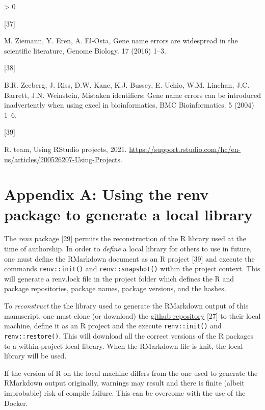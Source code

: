\documentclass[]{elsarticle} %
\newlength{\csllabelwidth}
\newlength{\cslhangindent}
\newenvironment{CSLReferences}[3] %
 {%
  \setlength{\parindent}{0pt}
  \ifodd #1 \everypar{\setlength{\hangindent}{\cslhangindent}}\ignorespaces\fi
  \ifnum #2 > 0
  \setlength{\parskip}{#2\baselineskip}
  \fi
 }%
 {}
\newcommand{\CSLLeftMargin}[1]{\parbox[t]{\csllabelwidth}{#1}}
\newcommand{\CSLRightInline}[1]{\parbox[t]{\linewidth - \csllabelwidth}{#1}}
\begin{document}
\begin{CSLReferences}{0}{0}
\leavevmode\hypertarget{ref-ziemann2016gene}{}%
\CSLLeftMargin{{[}37{]} }
\CSLRightInline{M. Ziemann, Y. Eren, A. El-Osta, Gene name errors are
widespread in the scientific literature, Genome Biology. 17 (2016)
1--3.}

\leavevmode\hypertarget{ref-zeeberg2004mistaken}{}%
\CSLLeftMargin{{[}38{]} }
\CSLRightInline{B.R. Zeeberg, J. Riss, D.W. Kane, K.J. Bussey, E. Uchio,
W.M. Linehan, J.C. Barrett, J.N. Weinstein, Mistaken identifiers: Gene
name errors can be introduced inadvertently when using excel in
bioinformatics, BMC Bioinformatics. 5 (2004) 1--6.}

\leavevmode\hypertarget{ref-rprojects}{}%
\CSLLeftMargin{{[}39{]} }
\CSLRightInline{R. team, Using RStudio projects, 2021.
\url{https://support.rstudio.com/hc/en-us/articles/200526207-Using-Projects}.}

\end{CSLReferences}

\hypertarget{appendix-a-using-the-renv-package-to-generate-a-local-library}{%
\section*{Appendix A: Using the renv package to generate a local
library}\label{appendix-a-using-the-renv-package-to-generate-a-local-library}}

The \emph{renv} package {[}29{]} permits the reconstruction of the R
library used at the time of authorship. In order to \emph{define} a
local library for others to use in future, one must define the RMarkdown
document as an R project {[}39{]} and execute the commands
\texttt{renv::init()} and \texttt{renv::snapshot()} within the project
context. This will generate a renv.lock file in the project folder which
defines the R and package repositories, package names, package versions,
and the hashes.

To \emph{reconstruct} the the library used to generate the RMarkdown
output of this manuscript, one must clone (or download) the
\href{https://github.com/drdanholmes/jmsacl_reproducible_research}{github
repository} {[}27{]} to their local machine, define it as an R project
and the execute \texttt{renv::init()} and \texttt{renv::restore()}. This
will download all the correct versions of the R packages to a
within-project local library. When the RMarkdown file is knit, the local
library will be used.

If the version of R on the local machine differs from the one used to
generate the RMarkdown output originally, warnings may result and there
is finite (albeit improbable) risk of compile failure. This can be
overcome with the use of the Docker.
\end{document}
